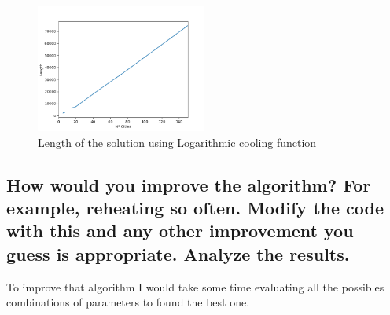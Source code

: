 \documentclass{article}
\begin{document}
            \begin{figure}[H]

                \centering
                \includegraphics[width=0.5\textwidth]{../media/03.SimAnnealing-Logarithmic-length.png}
                \caption{Length of the solution using Logarithmic cooling function}
                \label{Length of the solution using Logarithmic cooling function}
    
            \end{figure}
    
        \subsection{How would you improve the algorithm? For example, reheating so often. Modify
    the code with this and any other improvement you guess is appropriate. Analyze
    the results.}

            To improve that algorithm I would take some time evaluating all the possibles combinations of parameters to found the best one.
\end{document}

